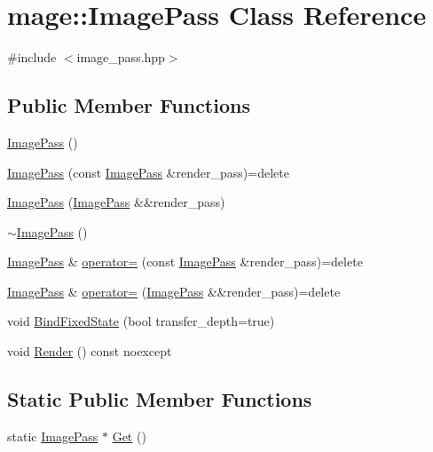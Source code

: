 \hypertarget{classmage_1_1_image_pass}{}\section{mage\+:\+:Image\+Pass Class Reference}
\label{classmage_1_1_image_pass}


{\ttfamily \#include $<$image\+\_\+pass.\+hpp$>$}

\subsection*{Public Member Functions}
\begin{DoxyCompactItemize}
\item 
\hyperlink{classmage_1_1_image_pass_af0254b5af3af9fba2f8969a29bf44f9c}{Image\+Pass} ()
\item 
\hyperlink{classmage_1_1_image_pass_ae0235ed340899dcff61ba38b5616267a}{Image\+Pass} (const \hyperlink{classmage_1_1_image_pass}{Image\+Pass} \&render\+\_\+pass)=delete
\item 
\hyperlink{classmage_1_1_image_pass_a4f917e053dfdfdfcdb56aea7e89ff9d1}{Image\+Pass} (\hyperlink{classmage_1_1_image_pass}{Image\+Pass} \&\&render\+\_\+pass)
\item 
\hyperlink{classmage_1_1_image_pass_a599812d493826d5ebd5cd07bde97f5d1}{$\sim$\+Image\+Pass} ()
\item 
\hyperlink{classmage_1_1_image_pass}{Image\+Pass} \& \hyperlink{classmage_1_1_image_pass_afc3144652cad2cb7bf88af28c98cf343}{operator=} (const \hyperlink{classmage_1_1_image_pass}{Image\+Pass} \&render\+\_\+pass)=delete
\item 
\hyperlink{classmage_1_1_image_pass}{Image\+Pass} \& \hyperlink{classmage_1_1_image_pass_adb56246449b95b8f9cbbbb118caa30c3}{operator=} (\hyperlink{classmage_1_1_image_pass}{Image\+Pass} \&\&render\+\_\+pass)=delete
\item 
void \hyperlink{classmage_1_1_image_pass_aa39b5368166ffe2ec5daff218f848d50}{Bind\+Fixed\+State} (bool transfer\+\_\+depth=true)
\item 
void \hyperlink{classmage_1_1_image_pass_ae244ceb2ba0af61cb5814c2775d4e303}{Render} () const noexcept
\end{DoxyCompactItemize}
\subsection*{Static Public Member Functions}
\begin{DoxyCompactItemize}
\item 
static \hyperlink{classmage_1_1_image_pass}{Image\+Pass} $\ast$ \hyperlink{classmage_1_1_image_pass_ac0a674ae8f92dc731a2ac6b6df1dee2b}{Get} ()
\end{DoxyCompactItemize}
